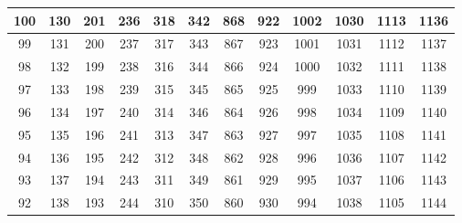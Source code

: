 \begin{table}
\begin{center}
{\begin{tabular} {| c | c | c | c | c | c | c | c | c | c | c | c | }
\cellcolor{red!25}100 & 130                      &  201 & 236 & \cellcolor{red!25}318 & \cellcolor{red!25}342 & 868 & \cellcolor{red!25}922 & 1002                      & 1030 & 1113                       & \cellcolor{red!25}1136 \\ \hline
\cellcolor{red!25} 99 & 131                      &  200 & 237 & 317                      & 343                      & 867 & 923                      & 1001                      & 1031 & 1112                       & \cellcolor{red!25}1137 \\ \hline
 98                      & 132                      &  199 & 238 & 316                      & 344                      & 866 & 924                      & 1000                      & 1032 & 1111                       & \cellcolor{red!25}1138 \\ \hline
 97                      & 133                      &  198 & 239 & 315                      & 345                      & 865 & 925                      &  999                      & 1033 & 1110                       & 1139                      \\ \hline
 96                      & 134                      &  197 & 240 & 314                      & 346                      & 864 & 926                      &  998                      & 1034 & 1109                       & 1140                      \\ \hline
 95                      & 135                      &  196 & 241 & 313                      & 347                      & 863 & 927                      &  997                      & 1035 & 1108                       & 1141                      \\ \hline
 94                      & 136                      &  195 & 242 & 312                      & 348                      & 862 & 928                      &  996                      & 1036 & 1107                       & 1142                      \\ \hline
 93                      & 137                      &  194 & 243 & 311                      & 349                      & 861 & 929                      &  995                      & 1037 & 1106                       & 1143                      \\ \hline
 92                      & 138                      &  193 & 244 & 310                      & 350                      & 860 & 930                      &  994                      & 1038 & 1105                       & 1144                      \\ \hline

\end{tabular}}
\end{center}
\end{table}
